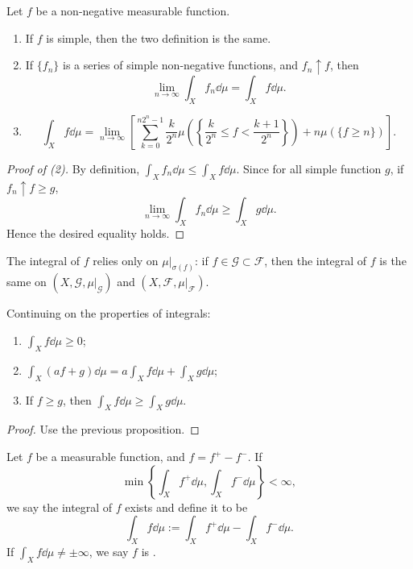 \begin{proposition}
	Let $f$ be a non-negative measurable function.
	\begin{enumerate}[(1)]
		\item If $f$ is simple, then the two definition is the same.
		\item If $\{f_n\}$ is a series of simple non-negative functions,
			and $f_n\uparrow f$, then
			\[
				\lim_{n\to \infty} \int _X f_n\dd \mu
				= \int _X f\dd \mu.
			\]
		\item
			\[
		\int_X f \dd \mu = \lim_{n\to \infty} \left[\sum_{k=0}^{n2^n - 1}
		\frac{k}{2^n}\mu\left(\left\{\frac{k}{2^n}\le f < \frac{k+1}{2^n}\right\}\right)
		+ n\mu(\{f\ge n\})\right].
			\]
	\end{enumerate}
\end{proposition}
\begin{proof}[Proof of (2)]
    By definition, $\int_X f_n \dd \mu \le \int _X f\dd \mu$.
	Since for all simple function $g$, if $f_n\uparrow f\ge g$,
	\[
		\lim_{n\to \infty} \int_X f_n\dd \mu\ge \int_X g\dd \mu.
	\]
	Hence  the desired equality holds.
\end{proof}
\begin{remark}
    The integral of $f$ relies only on $\mu\big|_{\sigma(f)}$:
	if $f\in \mathscr{G}\subset \mathscr{F}$, then the integral of $f$
	is the same on $(X, \mathscr{G}, \mu\big|_{\mathscr{G}})$
	and $(X, \mathscr{F}, \mu\big|_{\mathscr{F}})$.
\end{remark}

\begin{proposition}
	Continuing on the properties of integrals:
	\begin{enumerate}[(1)]
		\item $\int_X f \dd \mu \ge 0$;
		\item $\int_X (af + g)\dd \mu = a\int_X f\dd \mu + \int_X g\dd \mu$;
		\item If $f\ge g$, then $\int_X f\dd \mu\ge \int_X g\dd \mu$.
	\end{enumerate}
\end{proposition}
\begin{proof}[Proof]
    Use the previous proposition.
\end{proof}

\begin{definition}
	Let $f$ be a measurable function, and $f = f^+ - f^-$.
	If
	\[
	\min\left\{\int_X f^+\dd \mu, \int_X f^- \dd \mu\right\} < \infty,
	\]
	we say the integral of $f$ exists and define it to be
	\[
	\int_X f\dd \mu := \int_X f^+\dd \mu - \int_X f^- \dd \mu.
	\]
	If $\int _X f\dd \mu \ne \pm \infty$, we say $f$ is .
\end{definition}

